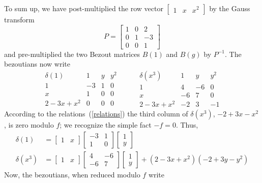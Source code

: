 \documentclass{standalone}
\begin{document}
To sum up, we have post-multiplied the row vector
$\begin{bmatrix}
	1 & x & x^2
\end{bmatrix}$ by the Gauss transform
$$P =
\begin{bmatrix}
	1 & 0 & 2 \\
	0 & 1 & -3 \\
	0 & 0 & 1
\end{bmatrix}$$
and pre-multiplied the two Bezout matrices $B(1)$ and $B(g)$ by $P^{-1}$. The bezoutians now write
$$
\begin{array}{c|ccc}
	\delta(1) & 1 & y & y^2\\
	\hline
	1 & -3 & 1 & 0\\
	x & 1 & 0 & 0\\
	2 - 3x + x^2 & 0 & 0 & 0
\end{array}
\hspace{1cm}
\begin{array}{c|ccc}
	\delta(x^3) & 1 & y & y^2\\
	\hline
	1 & 4 & -6 & 0 \\
	x & -6 & 7 & 0 \\
	2 - 3x + x^2 & -2 & 3 & -1
\end{array}
$$
According to the relations~(\ref{relations}) the third column of $\delta(x^3)$,  $-2 + 3x - x^2$, is zero modulo $f$; we recognize the simple fact $-f = 0$. Thus,
\begin{align} \nonumber %
\delta(1) &= \begin{bmatrix}
	1 & x
\end{bmatrix}
\begin{bmatrix}
	-3 & 1 \\
	1 & 0
\end{bmatrix} \nonumber %
\begin{bmatrix}
	1 \\
	y
\end{bmatrix}\\
\delta(x^3) &= \begin{bmatrix}
	1 & x
\end{bmatrix}
\begin{bmatrix}
	4 & -6 \\
	-6 & 7
\end{bmatrix} \nonumber %
\begin{bmatrix}
	1 \\
	y
\end{bmatrix} + (2 - 3x + x^2)(-2 + 3y - y^2)
\end{align}
Now, the bezoutians, when reduced modulo $f$ write
\end{document}
